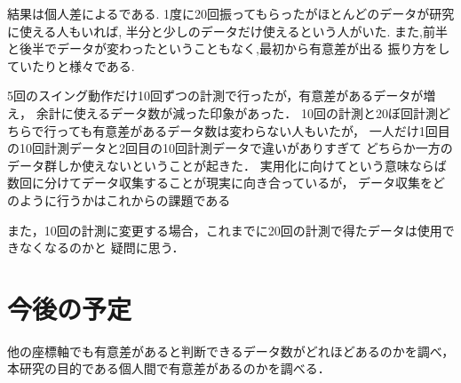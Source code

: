     結果は個人差によるである.
    1度に20回振ってもらったがほとんどのデータが研究に使える人もいれば,
    半分と少しのデータだけ使えるという人がいた.
    また,前半と後半でデータが変わったということもなく,最初から有意差が出る
    振り方をしていたりと様々である.

    5回のスイング動作だけ10回ずつの計測で行ったが，有意差があるデータが増え，
    余計に使えるデータ数が減った印象があった．
    10回の計測と20ぼ回計測どちらで行っても有意差があるデータ数は変わらない人もいたが，
    一人だけ1回目の10回計測データと2回目の10回計測データで違いがありすぎて
    どちらか一方のデータ群しか使えないということが起きた．
    実用化に向けてという意味ならば数回に分けてデータ収集することが現実に向き合っているが，
    データ収集をどのように行うかはこれからの課題である

    また，10回の計測に変更する場合，これまでに20回の計測で得たデータは使用できなくなるのかと
    疑問に思う．

    \section{今後の予定}
        他の座標軸でも有意差があると判断できるデータ数がどれほどあるのかを調べ，
        本研究の目的である個人間で有意差があるのかを調べる．
